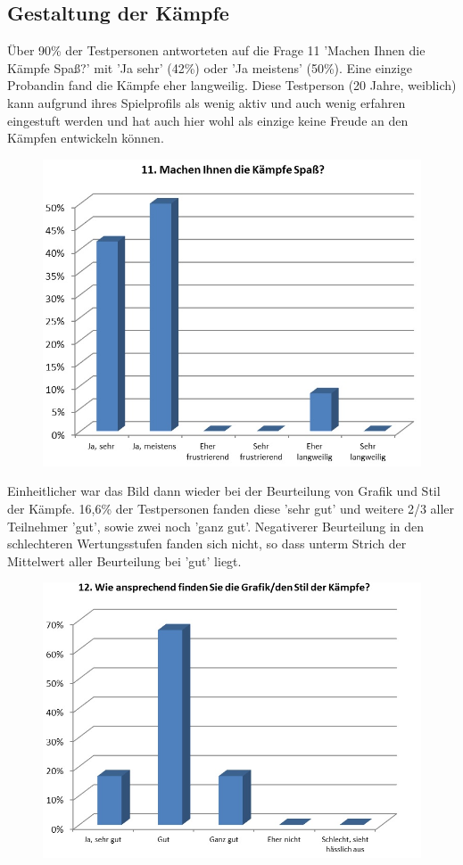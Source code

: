\documentclass[extern,palatino]{cgBA}
\begin{document}
\subsection{Gestaltung der Kämpfe}
Über 90\% der Testpersonen antworteten auf die Frage 11 'Machen Ihnen die Kämpfe Spaß?' mit 'Ja sehr'  (42\%) oder 'Ja meistens' (50\%). Eine einzige Probandin fand die Kämpfe eher langweilig. Diese Testperson (20 Jahre, weiblich) kann aufgrund ihres Spielprofils als wenig aktiv und auch wenig erfahren eingestuft werden und hat auch hier wohl als einzige keine Freude an den Kämpfen entwickeln können. 
\begin{figure}[H]
	\centering
	\includegraphics[width=1\textwidth]{table9.jpg}
\end{figure}
Einheitlicher war das Bild dann wieder bei der Beurteilung von Grafik und Stil der Kämpfe. 16,6\% der Testpersonen fanden diese 'sehr gut' und weitere 2/3 aller Teilnehmer 'gut', sowie zwei noch 'ganz gut'. Negativerer Beurteilung in den schlechteren Wertungsstufen fanden sich nicht, so dass unterm Strich der Mittelwert aller Beurteilung bei 'gut' liegt.
\begin{figure}[H]
	\centering
	\includegraphics[width=1\textwidth]{table10.jpg}
\end{figure}
\end{document}
